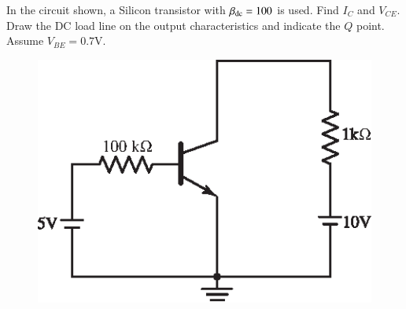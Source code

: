 \smallskip
\begin{example}\label{exam4.5}
In the circuit shown, a Silicon transistor with $\beta_{\operatorname{dc}}=100$ is used. Find $I_{C}$ and $V_{CE}$. Draw the DC load line on the output characteristics and indicate the $Q$ point. Assume $V_{BE}=0.7\text{V}$.
\begin{figure}[H]
\centering
\includegraphics{chap3/S3-EE-03-IN005.eps}
\end{figure}
\end{example}

\eject

